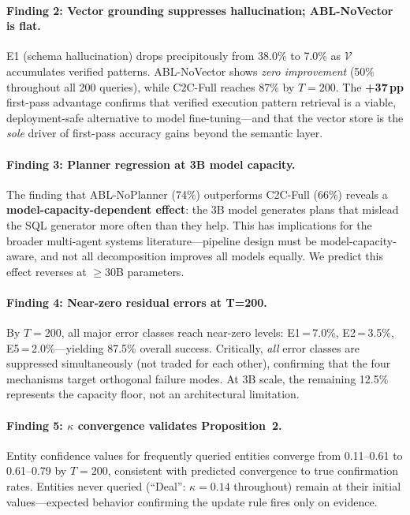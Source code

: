 \documentclass[11pt,a4paper]{article}
\begin{document}
\paragraph{Finding 2: Vector grounding suppresses hallucination; ABL-NoVector is flat.}
E1 (schema hallucination) drops precipitously from 38.0\% to 7.0\% as
$\mathcal{V}$ accumulates verified patterns.  ABL-NoVector shows \emph{zero
improvement} (50\% throughout all 200 queries), while C2C-Full reaches 87\% by
$T{=}200$.  The \textbf{+37\,pp} first-pass advantage confirms that verified
execution pattern retrieval is a viable, deployment-safe alternative to model
fine-tuning---and that the vector store is the \emph{sole} driver of first-pass
accuracy gains beyond the semantic layer.

\paragraph{Finding 3: Planner regression at 3B model capacity.}
The finding that ABL-NoPlanner (74\%) outperforms C2C-Full (66\%) reveals a
\textbf{model-capacity-dependent effect}: the 3B model generates plans that mislead
the SQL generator more often than they help.  This has implications for the broader
multi-agent systems literature---pipeline design must be model-capacity-aware, and
not all decomposition improves all models equally.  We predict this effect reverses
at $\geq$30B parameters.

\paragraph{Finding 4: Near-zero residual errors at T=200.}
By $T{=}200$, all major error classes reach near-zero levels: E1\,=\,7.0\%,
E2\,=\,3.5\%, E5\,=\,2.0\%---yielding 87.5\% overall success.  Critically,
\emph{all} error classes are suppressed simultaneously (not traded for each other),
confirming that the four mechanisms target orthogonal failure modes.  At 3B scale,
the remaining 12.5\% represents the capacity floor, not an architectural limitation.

\paragraph{Finding 5: $\kappa$ convergence validates Proposition~2.}
Entity confidence values for frequently queried entities converge from 0.11--0.61
to 0.61--0.79 by $T{=}200$, consistent with predicted convergence to true
confirmation rates.  Entities never queried (``Deal'': $\kappa{=}0.14$ throughout)
remain at their initial values---expected behavior confirming the update rule fires
only on evidence.
\end{document}
